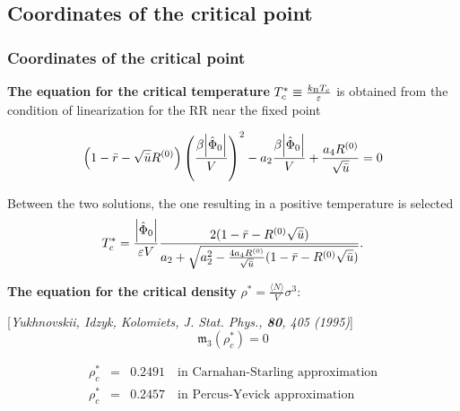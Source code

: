 \documentclass[8pt]{beamer}
\begin{document}
	\subsection{Coordinates of the critical point}
	
	\begin{frame}
		\frametitle{Coordinates of the critical point}
		
		\textbf{The equation for the critical temperature} $T_c^* \equiv \frac{k_{{\rm B}}T_c}{\varepsilon}$  is obtained from the condition of linearization for the RR near the fixed point
		
		\begin{equation*}
			\left(1 - \bar{r} - \sqrt{\bar{u}}R^{(0)}\right) \left(\frac{\beta\abs{\hat{\Phi}_0}}{V}\right)^2 - a_2\frac{\beta\abs{\hat{\Phi}_0}}{V} + \frac{a_4 R^{(0)}}{\sqrt{\bar{u}}} = 0
		\end{equation*}
		
		Between the two solutions, the one resulting in a positive temperature is selected
		\begin{equation*}
			\label{eq:T_c}
			T^*_c = \frac{\abs{\hat{\Phi}_0}}{\varepsilon V}
			\frac
			{2(1 - \bar{r} - R^{(0)}\sqrt{\bar{u}})}
			{a_2 + \sqrt{a_2^2 - \frac{4 a_4 R^{(0)}}{\sqrt{\bar{u}}} (1 - \bar{r} - R^{(0)}\sqrt{\bar{u}}) } }.
		\end{equation*}
		
		\textbf{The equation for the critical density} $\rho^*=\frac{\langle N \rangle}{V}\sigma^3$:
		
		[\textit{Yukhnovskii, Idzyk, Kolomiets, J. Stat. Phys., \textbf{80}, 405 (1995)}]
		\begin{equation*}
			\mathfrak{m}_3(\rho^*_c) = 0 
		\end{equation*}
		
		\begin{eqnarray*}
			\rho^*_c & = & 0.2491 \quad \text{in Carnahan-Starling approximation}
			\\
			\rho^*_c & = & 0.2457 \quad \text{in Percus-Yevick approximation}
		\end{eqnarray*}
	\end{frame}
	
\end{document}
